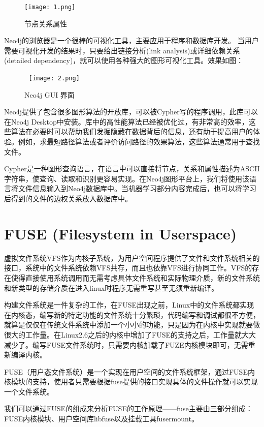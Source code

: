 \documentclass[UTF8]{ctexart}
\begin{document}
\begin{figure}[htbp]
\centering\texttt{[image: 1.png]}
\caption{节点关系属性}
\end{figure}

Neo4j的浏览器是一个很棒的可视化工具，主要应用于程序和数据库开发。 当用户需要可视化开发的结果时，只要给出链接分析(link analysis)或详细依赖关系(detailed dependency)，就可以使用各种强大的图形可视化工具。效果如图：

\begin{figure}[htbp]
\centering\texttt{[image: 2.png]}
\caption{Neo4j GUI 界面}
\end{figure}

Neo4j提供了包含很多图形算法的开放库，可以被Cypher写的程序调用，此库可以在Neo4j Desktop中安装。库中的高性能算法已经被优化过，有非常高的效率，这些算法在必要时可以帮助我们发掘隐藏在数据背后的信息，还有助于提高用户的体验。例如，求最短路径算法或者评价访问路径的效果算法，这些算法通常用于查找文件。

Cypher是一种图形查询语言，在语言中可以直接将节点，关系和属性描述为ASCII字符串，使查询、读取和识别更容易实现。在Neo4j图形平台上，我们将使用该语言将文件信息输入到Neo4j数据库中。当机器学习部分内容完成后，也可以将学习后得到的文件的边权关系放入数据库中。

\section{FUSE (Filesystem in Userspace)}

虚拟文件系统VFS作为内核子系统，为用户空间程序提供了文件和文件系统相关的接口，系统中的文件系统依赖VFS共存，而且也依靠VFS进行协同工作。VFS的存在使得直接使用系统调用而无需考虑具体文件系统和实际物理介质，新的文件系统和新类型的存储介质在进入linux时程序无需重写甚至无须重新编译。

构建文件系统是一件复杂的工作，在FUSE出现之前，Linux中的文件系统都实现在内核态，编写新的特定功能的文件系统十分繁琐，代码编写和调试都很不方便，就算是仅仅在传统文件系统中添加一个小小的功能，只是因为在内核中实现就要做很大的工作量。在Linux2.6之后的内核中增加了FUSE的支持之后，工作量就大大减少了。编写FUSE文件系统时，只需要内核加载了FUZE内核模块即可，无需重新编译内核。

FUSE（用户态文件系统）是一个实现在用户空间的文件系统框架，通过FUSE内核模块的支持，使用者只需要根据fuse提供的接口实现具体的文件操作就可以实现一个文件系统。 

我们可以通过FUSE的组成来分析FUSE的工作原理——fuse主要由三部分组成：FUSE内核模块、用户空间库libfuse以及挂载工具fusermount。
\end{document}
